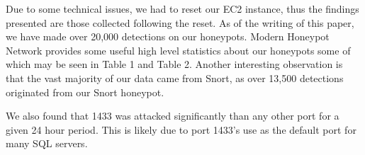 Due to some technical issues, we had to reset our EC2 instance, thus the findings presented are those collected following the reset. As of the writing of this paper, we have made over 20,000 detections on our honeypots. Modern Honeypot Network provides some useful high level statistics about our honeypots some of which may be seen in Table 1 and Table 2. Another interesting observation is that the vast majority of our data came from Snort, as over 13,500 detections originated from our Snort honeypot.

We also found that 1433 was attacked significantly than any other port for a given 24 hour period. This is likely due to port 1433's use as the default port for many SQL servers.


\begin{table}[H]
\caption{Top Five Individual Detected IP Addresses} \label{tab:ips}
\end{table}

\begin{table}[H]
\caption{Top Five Attacked Ports} \label{tab:ports}
\end{table}


